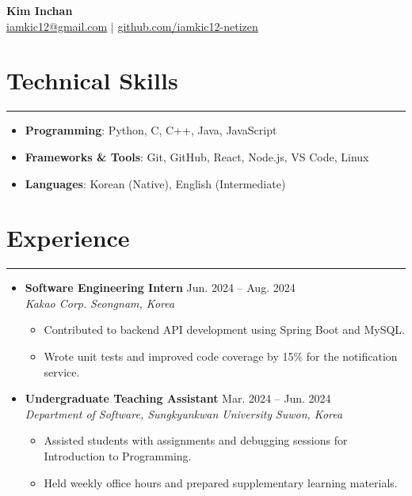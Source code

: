 \documentclass[letterpaper, 10pt]{article}
\begin{document}
\begin{center}
    \textbf{\LARGE Kim Inchan} \\ \vspace{2pt}
    \href{mailto:iamkic12@gmail.com}{\underline{iamkic12@gmail.com}} $|$
    \href{https://github.com/iamkic12-netizen}{\underline{github.com/iamkic12-netizen}}
\end{center}

\section*{Technical Skills}
\hrule
\vspace{4pt}
\begin{itemize}
    \item[] \textbf{Programming}: Python, C, C++, Java, JavaScript
    \item[] \textbf{Frameworks \& Tools}: Git, GitHub, React, Node.js, VS Code, Linux
    \item[] \textbf{Languages}: Korean (Native), English (Intermediate)
\end{itemize}

\section*{Experience}
\hrule
\vspace{4pt}
\begin{itemize}
    \item[]
    \textbf{Software Engineering Intern} \hfill Jun. 2024 -- Aug. 2024 \\
    \textit{Kakao Corp.} \hfill \textit{Seongnam, Korea}
    \begin{itemize}
        \item Contributed to backend API development using Spring Boot and MySQL.
        \item Wrote unit tests and improved code coverage by 15\% for the notification service.
    \end{itemize}
    \item[]
    \textbf{Undergraduate Teaching Assistant} \hfill Mar. 2024 -- Jun. 2024 \\
    \textit{Department of Software, Sungkyunkwan University} \hfill \textit{Suwon, Korea}
    \begin{itemize}
        \item Assisted students with assignments and debugging sessions for Introduction to Programming.
        \item Held weekly office hours and prepared supplementary learning materials.
    \end{itemize}
\end{itemize}
\end{document}
